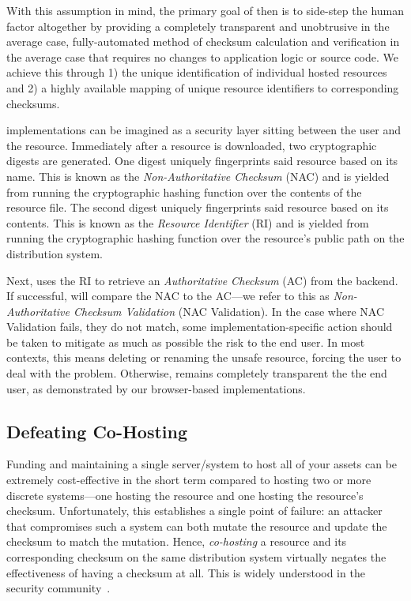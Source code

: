 With this assumption in mind, the primary goal of \SYSTEM{} then is to side-step
the human factor altogether by providing a completely transparent and
unobtrusive in the average case, fully-automated method of checksum calculation
and verification in the average case that requires no changes to application
logic or source code. We achieve this through 1) the unique identification of
individual hosted resources and 2) a highly available mapping of unique resource
identifiers to corresponding checksums.

\SYSTEM{} implementations can be imagined as a security layer sitting between
the user and the resource. Immediately after a resource is downloaded, two
cryptographic digests are generated. One digest uniquely fingerprints said
resource based on its name. This is known as the \emph{Non-Authoritative
Checksum} (NAC) and is yielded from running the cryptographic hashing function
over the contents of the resource file. The second digest uniquely fingerprints
said resource based on its contents. This is known as the \emph{Resource
Identifier} (RI) and is yielded from running the cryptographic hashing function
over the resource's public path on the distribution system.

Next, \SYSTEM{} uses the RI to retrieve an \emph{Authoritative Checksum} (AC)
from the backend. If successful, \SYSTEM{} will compare the NAC to the AC---we
refer to this as \emph{Non-Authoritative Checksum Validation} (NAC Validation).
In the case where NAC Validation fails, \ie they do not match, some
implementation-specific action should be taken to mitigate as much as possible
the risk to the end user. In most contexts, this means deleting or renaming the
unsafe resource, forcing the user to deal with the problem. Otherwise, \SYSTEM{}
remains completely transparent the the end user, as demonstrated by our
browser-based implementations.

\subsection{Defeating Co-Hosting}

Funding and maintaining a single server/system to host all of your assets can be
extremely cost-effective in the short term compared to hosting two or more
discrete systems---one hosting the resource and one hosting the resource's
checksum. Unfortunately, this establishes a single point of failure: an attacker
that compromises such a system can both mutate the resource and update the
checksum to match the mutation. Hence, \emph{co-hosting} a resource and its
corresponding checksum on the same distribution system virtually negates the
effectiveness of having a checksum at all. This is widely understood in the
security community~\cite{SCA-MINT2}.

